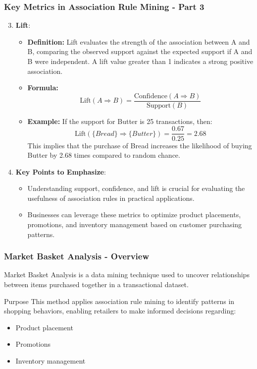 \documentclass{beamer}
\begin{document}
\begin{frame}[fragile]
    \frametitle{Key Metrics in Association Rule Mining - Part 3}
    \begin{enumerate}
        \setcounter{enumi}{2} %
        \item \textbf{Lift}:
        \begin{itemize}
            \item \textbf{Definition:} Lift evaluates the strength of the association between A and B, comparing the observed support against the expected support if A and B were independent. A lift value greater than 1 indicates a strong positive association.
            \item \textbf{Formula:}  
            \begin{equation}
                \text{Lift}(A \Rightarrow B) = \frac{\text{Confidence}(A \Rightarrow B)}{\text{Support}(B)}
            \end{equation}
            \item \textbf{Example:} If the support for {Butter} is 25 transactions, then:
            \begin{equation}
                \text{Lift}(\{Bread\} \Rightarrow \{Butter\}) = \frac{0.67}{0.25} = 2.68
            \end{equation}
            This implies that the purchase of Bread increases the likelihood of buying Butter by 2.68 times compared to random chance.
        \end{itemize}

        \item \textbf{Key Points to Emphasize}:
        \begin{itemize}
            \item Understanding support, confidence, and lift is crucial for evaluating the usefulness of association rules in practical applications.
            \item Businesses can leverage these metrics to optimize product placements, promotions, and inventory management based on customer purchasing patterns.
        \end{itemize}
    \end{enumerate}
\end{frame}

\begin{frame}[fragile]
    \frametitle{Market Basket Analysis - Overview}
    Market Basket Analysis is a data mining technique used to uncover relationships between items purchased together in a transactional dataset. 

    \begin{block}{Purpose}
        This method applies association rule mining to identify patterns in shopping behaviors, enabling retailers to make informed decisions regarding:
        \begin{itemize}
            \item Product placement
            \item Promotions
            \item Inventory management
        \end{itemize}
    \end{block}
\end{frame}
\end{document}
